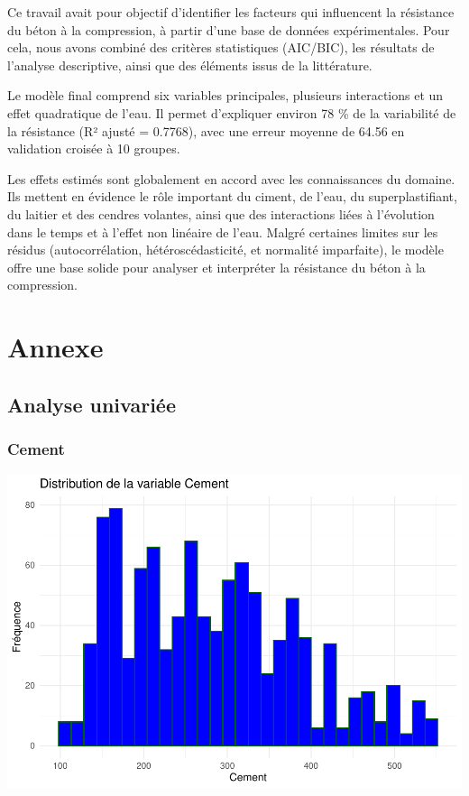 \documentclass[
  12pt,
]{article}
\begin{document}
Ce travail avait pour objectif d'identifier les facteurs qui influencent
la résistance du béton à la compression, à partir d'une base de données
expérimentales. Pour cela, nous avons combiné des critères statistiques
(AIC/BIC), les résultats de l'analyse descriptive, ainsi que des
éléments issus de la littérature.

Le modèle final comprend six variables principales, plusieurs
interactions et un effet quadratique de l'eau. Il permet d'expliquer
environ 78 \% de la variabilité de la résistance (R² ajusté = 0.7768),
avec une erreur moyenne de 64.56 en validation croisée à 10 groupes.

Les effets estimés sont globalement en accord avec les connaissances du
domaine. Ils mettent en évidence le rôle important du ciment, de l'eau,
du superplastifiant, du laitier et des cendres volantes, ainsi que des
interactions liées à l'évolution dans le temps et à l'effet non linéaire
de l'eau. Malgré certaines limites sur les résidus (autocorrélation,
hétéroscédasticité, et normalité imparfaite), le modèle offre une base
solide pour analyser et interpréter la résistance du béton à la
compression.

\section{Annexe}\label{annexe}

\subsection{Analyse univariée}\label{analyse-univariuxe9e}

\subsubsection{Cement}\label{cement}

\includegraphics{rmd_final_files/figure-latex/unnamed-chunk-1-1.pdf}
\end{document}
